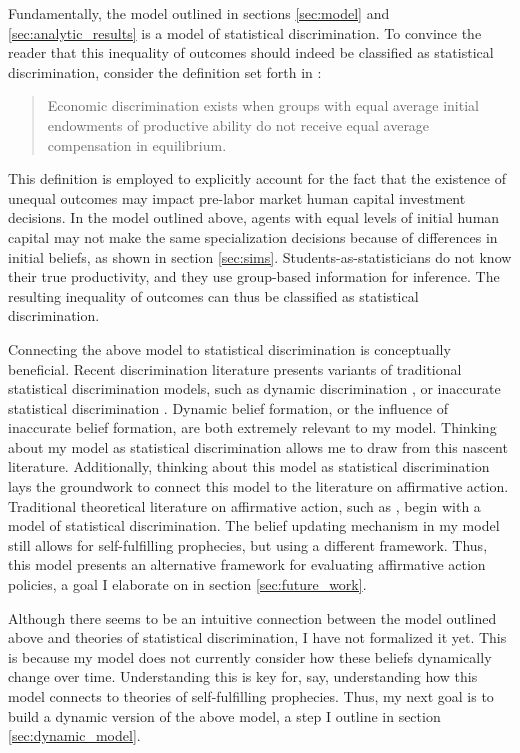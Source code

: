 Fundamentally, the model outlined in sections \ref{sec:model} and \ref{sec:analytic_results} is a model of statistical discrimination. 
To convince the reader that this inequality of outcomes should indeed be classified as statistical discrimination, consider the definition set forth in \textcite{LS83}:
\begin{quote}
Economic discrimination exists when groups with equal average initial endowments of productive ability do not receive equal average compensation in equilibrium.
\end{quote}
This definition is employed to explicitly account for the fact that the existence of unequal outcomes may impact pre-labor market human capital investment decisions. 
In the model outlined above, agents with equal levels of initial human capital may not make the same specialization decisions because of differences in initial beliefs, as shown in section \ref{sec:sims}.
Students-as-statisticians do not know their true productivity, and they use group-based information for inference. 
The resulting inequality of outcomes can thus be classified as statistical discrimination. 

Connecting the above model to statistical discrimination is conceptually beneficial.
Recent discrimination literature presents variants of traditional statistical discrimination models, such as dynamic discrimination \parencite{BIR19}, or inaccurate statistical discrimination \parencite{BHIP19-wp}. 
Dynamic belief formation, or the influence of inaccurate belief formation, are both extremely relevant to my model.
Thinking about my model as statistical discrimination allows me to draw from this nascent literature. 
Additionally, thinking about this model as statistical discrimination lays the groundwork to connect this model to the literature on affirmative action. 
Traditional theoretical literature on affirmative action, such as \textcite{CL93}, begin with a model of statistical discrimination.
The belief updating mechanism in my model still allows for self-fulfilling prophecies, but using a different framework.
Thus, this model presents an alternative framework for evaluating affirmative action policies, a goal I elaborate on in section \ref{sec:future_work}.

Although there seems to be an intuitive connection between the model outlined above and theories of statistical discrimination, I have not formalized it yet.
This is because my model does not currently consider how these beliefs dynamically change over time. 
Understanding this is key for, say, understanding how this model connects to theories of self-fulfilling prophecies.
Thus, my next goal is to build a dynamic version of the above model, a step I outline in section \ref{sec:dynamic_model}.